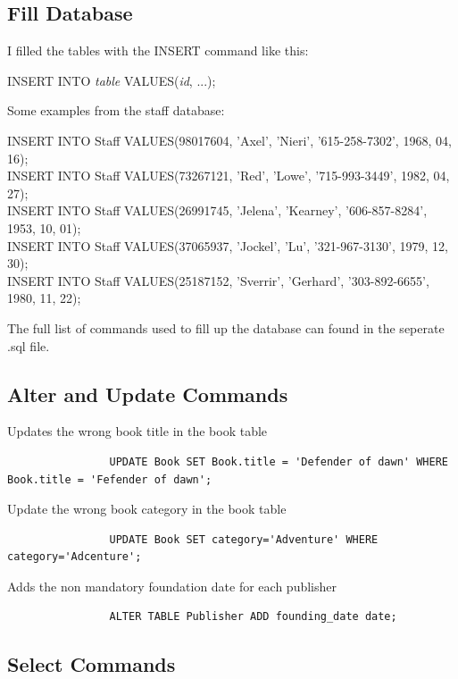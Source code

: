 \documentclass[11pt]{article}
\begin{document}
		\newpage
		\subsection{Fill Database}
			I filled the tables with the INSERT command like this:\\
			\begin{center}
				INSERT INTO \textit{table} VALUES(\textit{id}, ...); 
			\end{center}
			Some examples from the staff database:
			\begin{center}
				INSERT INTO Staff VALUES(98017604, 'Axel', 'Nieri', '615-258-7302', 1968, 04, 16);\\
				INSERT INTO Staff VALUES(73267121, 'Red', 'Lowe', '715-993-3449', 1982, 04, 27);\\
				INSERT INTO Staff VALUES(26991745, 'Jelena', 'Kearney', '606-857-8284', 1953, 10, 01);\\
				INSERT INTO Staff VALUES(37065937, 'Jockel', 'Lu', '321-967-3130', 1979, 12, 30);\\
				INSERT INTO Staff VALUES(25187152, 'Sverrir', 'Gerhard', '303-892-6655', 1980, 11, 22);
			\end{center}
			The full list of commands used to fill up the database can found in the seperate .sql file.
		
		\subsection{Alter and Update Commands}
			Updates the wrong book title in the book table
			\begin{verbatim}
				UPDATE Book SET Book.title = 'Defender of dawn' WHERE Book.title = 'Fefender of dawn';
			\end{verbatim}		
			
			Update the wrong book category in the book table
			\begin{verbatim}
				UPDATE Book SET category='Adventure' WHERE category='Adcenture';
			\end{verbatim}
			
			Adds the non mandatory foundation date for each publisher
			\begin{verbatim}
				ALTER TABLE Publisher ADD founding_date date;
			\end{verbatim}						
		
		\subsection{Select Commands}
			
\end{document}
